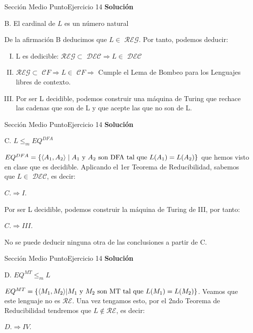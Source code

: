 \documentclass[10pt, envcountsect, presentation, aspectratio=169]{beamer}
\newcommand{\lreg}{\ensuremath{\mathcal {REG}}}
\newcommand{\lcf}{\ensuremath{\mathcal CF}}
\newcommand{\ld}{\ensuremath{\mathcal {DEC}}}
\newcommand{\lr}{\ensuremath{\mathcal {RE}}}
\begin{document}
\begin{frame}{Sección Medio Punto}{Ejercicio 14}
    \textbf{Solución}\\
     \begin{center}
        B. El cardinal de $L$ es un número natural
    \end{center}
    De la afirmación B deducimos que $L \in$ \lreg. Por tanto, podemos deducir:
    \begin{enumerate}[I.]
        \item L es dedicible: \lreg $\subset$ \ld $\Rightarrow L \in$ \ld
        \item \lreg $\subset$ \lcf $\Rightarrow L \in$ \lcf $\Rightarrow$ Cumple el Lema de Bombeo para los Lenguajes libres de contexto.
        \item Por ser L decidible, podemos construir una máquina de Turing que rechace las cadenas que son de L y que acepte las que no son de L.
    \end{enumerate}
\end{frame}

\begin{frame}{Sección Medio Punto}{Ejercicio 14}
    \textbf{Solución}\\
     \begin{center}
        C. $L \le_m  EQ^{DFA}$  
    \end{center}
    $EQ^{DFA} = \{\langle A_1, A_2\rangle \space \mid \space A_1 \text{ y } A_2 \text{ son DFA tal que } L(A_1) = L(A_2)\}$  que hemos visto en clase que es decidible.
    \vspace{3mm}
    Aplicando el 1er Teorema de Reducibilidad, sabemos que $L\in$ \ld, es decir: 
    \begin{center}
        $C. \Rightarrow I.$
    \end{center}
    Por ser L decidible, podemos construir la máquina de Turing de III, por tanto: 
    \begin{center}
        $C. \Rightarrow III.$
    \end{center}
    No se puede deducir ninguna otra de las conclusiones a partir de C.
     
\end{frame}

\begin{frame}{Sección Medio Punto}{Ejercicio 14}
    \textbf{Solución}\\
     \begin{center}
        D. $EQ^{MT} \le_m L$   
    \end{center}
    $EQ^{MT} = \{\langle M_1, M_2\rangle \space | \space M_1 \text{ y } M_2 \text{ son MT tal que } L(M_1) = L(M_2)\}$. Veamos que este lenguaje no es \lr. Una vez tengamos esto, por el 2ndo Teorema de Reducibilidad tendremos que $L\notin \lr$, es decir:
    \begin{center}
        $D. \Rightarrow IV.$
    \end{center}
\end{frame}
\end{document}
